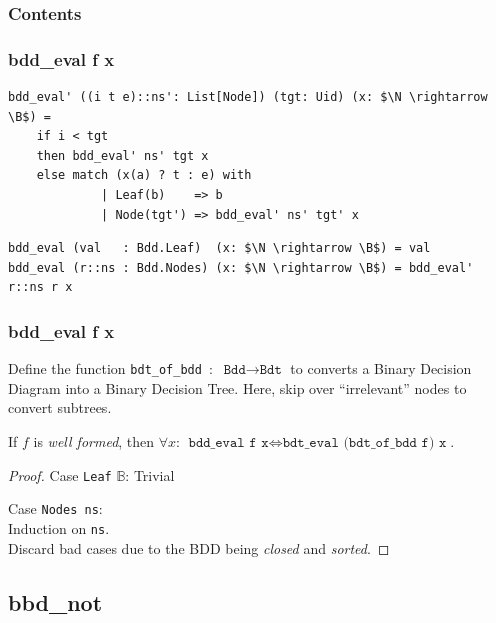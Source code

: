 \documentclass[english, aspectratio=169]{beamer}
\newcommand{\B}[0]{\ensuremath{\mathbb{B}}}
\begin{document}
\begin{frame}{}
  \frametitle{Contents}
\end{frame}

\begin{frame}[fragile]
  \frametitle{bdd\_eval f x}

  \begin{lstlisting}
bdd_eval' ((i t e)::ns': List[Node]) (tgt: Uid) (x: $\N \rightarrow \B$) =
    if i < tgt
    then bdd_eval' ns' tgt x
    else match (x(a) ? t : e) with
             | Leaf(b)    => b
             | Node(tgt') => bdd_eval' ns' tgt' x
   \end{lstlisting}
   \begin{lstlisting}[firstnumber=7]
bdd_eval (val   : Bdd.Leaf)  (x: $\N \rightarrow \B$) = val
bdd_eval (r::ns : Bdd.Nodes) (x: $\N \rightarrow \B$) = bdd_eval' r::ns r x
  \end{lstlisting}
\end{frame}

\begin{frame}
  \frametitle{bdd\_eval f x}

  Define the function \texttt{bdt\_of\_bdd}~:~$\texttt{Bdd} \rightarrow \texttt{Bdt}$ to converts a
  Binary Decision Diagram into a Binary Decision Tree. Here, skip over ``irrelevant'' nodes to
  convert subtrees.

  \pause

  \begin{theorem}
    If $f$ is \emph{well formed}, then $\forall x$:
    $\texttt{bdd\_eval f x} \iff \texttt{bdt\_eval (bdt\_of\_bdd f) x}$.
  \end{theorem}
  \begin{proof}
    Case \texttt{Leaf} $\B$: Trivial

    Case \texttt{Nodes ns}:\\
    \quad Induction on \texttt{ns}.\\
    \quad Discard bad cases due to the BDD being \emph{closed} and \emph{sorted}.
  \end{proof}
\end{frame}

\subsection{bbd\_not}
\end{document}
